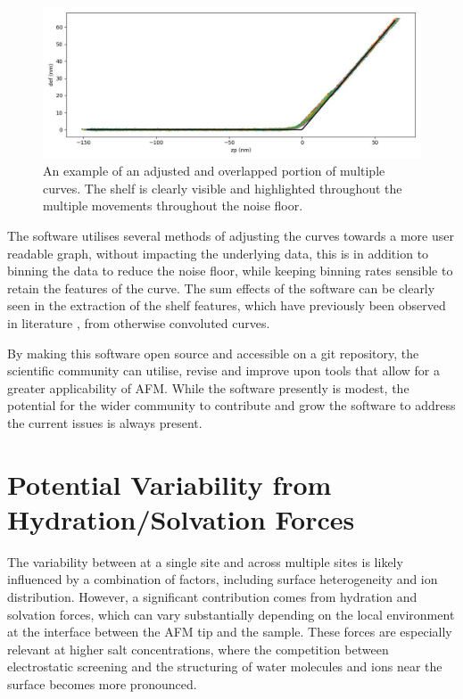\begin{figure}[h!]
\centering
\includegraphics[width=\textwidth]{chapter8/Shelf/Post 1.6 S4 df_zp.jpg}
\caption{An example of an adjusted and overlapped portion of multiple curves. The shelf is clearly visible and highlighted throughout the multiple movements throughout the noise floor.}
\label{fig:noisey}
\end{figure}

The software utilises several methods of adjusting the curves towards a more user readable graph, without impacting the underlying data, this is in addition to binning the data to reduce the noise floor, while keeping binning rates sensible to retain the features of the curve. The sum effects of the software can be clearly seen in the extraction of the shelf features, which have previously been observed in literature \cite{Kilpatrick2013DirectlyProbing}, from otherwise convoluted curves. %

By making this software open source and accessible on a git repository, the scientific community can utilise, revise and improve upon tools that allow for a greater applicability of AFM. While the software presently is modest, the potential for the wider community to contribute and grow the software to address the current issues is always present. \cite{YourGithub2023}

\section{Potential Variability from Hydration/Solvation Forces}

The variability between at a single site and across multiple sites is likely influenced by a combination of factors, including surface heterogeneity and ion distribution. However, a significant contribution comes from hydration and solvation forces, which can vary substantially depending on the local environment at the interface between the AFM tip and the sample. These forces are especially relevant at higher salt concentrations, where the competition between electrostatic screening and the structuring of water molecules and ions near the surface becomes more pronounced.

